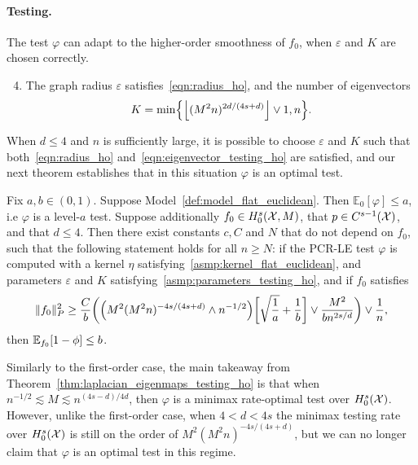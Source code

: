 \begin{itemize}
\end{itemize}

\paragraph{Testing.} The test $\varphi$ can adapt to the higher-order smoothness of $f_0$, when $\varepsilon$ and $K$ are chosen correctly.
\begin{enumerate}[label=(P\arabic*)]
	\setcounter{enumi}{3}
	\item 
	\label{asmp:parameters_testing_ho}
	The graph radius $\varepsilon$ satisfies~\eqref{eqn:radius_ho}, and the number of eigenvectors
	\begin{equation}
	\label{eqn:eigenvector_testing_ho}
	K = \min\Bigl\{\left\lfloor (M^2n)^{2d/(4s + d)} \right\rfloor \vee 1, n\Bigr\}.
	\end{equation}
\end{enumerate}
When $d \leq 4$ and $n$ is sufficiently large, it is possible to choose $\varepsilon$ and $K$ such that both~\eqref{eqn:radius_ho} and~\eqref{eqn:eigenvector_testing_ho} are satisfied, and our next theorem establishes that in this situation $\varphi$ is an optimal test.
\begin{theorem}
	\label{thm:laplacian_eigenmaps_testing_ho}
	Fix $a,b \in (0,1)$. Suppose Model~\ref{def:model_flat_euclidean}. Then $\mathbb{E}_0[\varphi] \leq a$, i.e $\varphi$ is a level-$a$ test. Suppose additionally $f_0 \in H_0^s(\mathcal{X},M)$, that $p \in C^{s-1}(\mathcal{X})$, and that $d \leq 4$. Then there exist constants $c,C$ and $N$ that do not depend on $f_0$, such that the following statement holds for all $n \geq N$: if the PCR-LE test $\varphi$ is computed with a kernel $\eta$ satisfying~\ref{asmp:kernel_flat_euclidean}, and parameters $\varepsilon$ and $K$ satisfying~\ref{asmp:parameters_testing_ho}, and if $f_0$ satisfies
	\begin{equation}
	\label{eqn:laplacian_eigenmaps_testing_criticalradius_ho}
	\|f_0\|_P^2 \geq \frac{C}{b}\biggl(\Bigl(M^2(M^2n)^{-4s/(4s + d) } \wedge n^{-1/2}\Bigr)\biggl[\sqrt{\frac{1}{a}} + \frac{1}{b}\biggr] \vee \frac{M^2}{b n^{2s/d}} \biggr) \vee \frac{1}{n},
	\end{equation}
	then $\mathbb{E}_{f_0}[1 - \phi] \leq b$.
\end{theorem}
Similarly to the first-order case, the main takeaway from Theorem~\ref{thm:laplacian_eigenmaps_testing_ho} is that when $n^{-1/2} \lesssim M \lesssim n^{(4s - d)/4d}$, then $\varphi$ is a minimax rate-optimal test over $H_0^s(\mathcal{X})$. However, unlike the first-order case, when $4 < d < 4s$ the minimax testing rate over $H_0^s(\mathcal{X})$ is still on the order of $M^2(M^2n)^{-4s/(4s + d)}$, but we can no longer claim that $\varphi$ is an optimal test in this regime.
